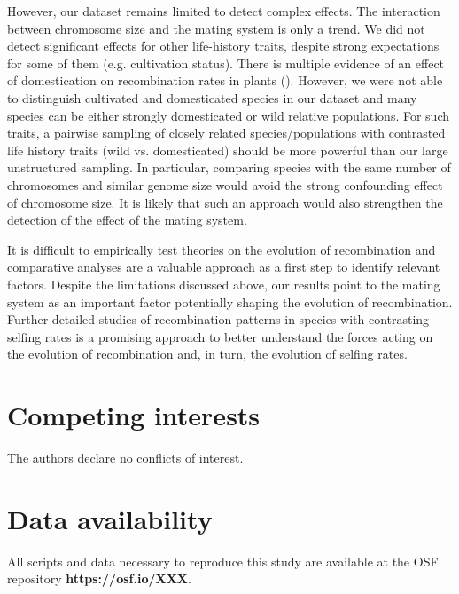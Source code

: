\documentclass{article}
\begin{document}
However, our dataset remains limited to detect complex effects. The interaction between chromosome size and the mating system is only a trend. We did not detect significant effects for other life-history traits, despite strong expectations for some of them (e.g. cultivation status). There is multiple evidence of an effect of domestication on recombination rates in plants (\cite{ross-ibarraGenomeSizeRecombination2007a,dreissigVariationRecombinationRate2019,fuentesDomesticationShapesRecombination2021,schreiberRecombinationLandscapeDivergence2022}). However, we were not able to distinguish cultivated and domesticated species in our dataset and many species can be either strongly domesticated or wild relative populations. For such traits, a pairwise sampling of closely related species/populations with contrasted life history traits (wild vs. domesticated) should be more powerful than our large unstructured sampling. In particular, comparing species with the same number of chromosomes and similar genome size would avoid the strong confounding effect of chromosome size. It is likely that such an approach would also strengthen the detection of the effect of the mating system.


It is difficult to empirically test theories on the evolution of recombination and comparative analyses are a valuable approach as a first step to identify relevant factors. Despite the limitations discussed above, our results point to the mating system as an important factor potentially shaping the evolution of recombination. Further detailed studies of recombination patterns in species with contrasting selfing rates is a promising approach to better understand the forces acting on the evolution of recombination and, in turn, the evolution of selfing rates.






\section*{Competing interests}

The authors declare no conflicts of interest.


\section*{Data availability} 

All scripts and data necessary to reproduce this study are available at the OSF repository \textbf{https://osf.io/XXX}.
\end{document}
